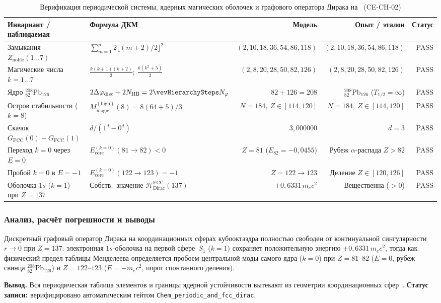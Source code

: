 \begin{table}[htbp]
\centering
\scriptsize
\setlength{\tabcolsep}{2.5pt}
\caption{Верификация периодической системы, ядерных магических оболочек и графового оператора Дирака на \latGCKshort\ (CE-CH-02)}
\label{tab:exp-ce-ch-02}
\begin{tabular}{@{}llrrr@{}}
\toprule
Инвариант / наблюдаемая & Формула ДКМ & Модель & Опыт / эталон & Статус \\
\midrule
Замыкания $Z_{\mathrm{noble}}(1\ldots 7)$ & $\sum_{m=1}^p 2\lfloor(m+2)/2\rfloor^2$ & $(2,10,18,36,54,86,118)$ & $(2,10,18,36,54,86,118)$ & PASS \\
Магические числа $k=1\ldots 7$ & $\frac{k(k+1)(k+2)}{3};\ \frac{k(k^2+5)}{3}$ & $(2,8,20,28,50,82,126)$ & $(2,8,20,28,50,82,126)$ & PASS \\
Ядро $^{208}_{82}\text{Pb}_{126}$ & $2\Delta\varphi_{\mathrm{disc}} + 2N_{\mathrm{HB}} = 2\vevHierarchySteps N_\varphi$ & $82 + 126 = 208$ & $^{208}_{82}\text{Pb}_{126}$ ($T_{1/2}=\infty$) & PASS \\
Остров стабильности ($k=8$) & $M_{\mathrm{magic}}^{(\mathrm{high})}(8) = 8(64+5)/3$ & $N=184,\ Z\in[114,120]$ & $N=184,\ Z\in[114,120]$ & PASS \\
Скачок $G_{\mathrm{FCC}}(0)-G_{\mathrm{FCC}}(1)$ & $d / (1^d - 0^d)$ & $3{,}000000$ & $d = 3$ & PASS \\
Переход $k=0$ через $E=0$ & $E_{\mathrm{core}}^{(k=0)}(81\to 82) < 0$ & $Z=81$ ($E_{82}=-0{,}0455$) & Рубеж $\alpha$-распада $Z>82$ & PASS \\
Пробой $k=0$ в $E=-1$ & $E_{\mathrm{core}}^{(k=0)}(122\to 123) = -1$ & $Z = 122 \to 123$ & Деление $Z\in[120,126]$ & PASS \\
Оболочка $1s$ ($k=1$) при $Z=137$ & Собств.\ значение $\mathcal{H}_{\mathrm{Dirac}}^{\mathrm{FCC}}(137)$ & $+0{,}6331\,m_e c^2$ & Вещественна ($>0$) & PASS \\
\bottomrule
\end{tabular}
\end{table}

\subsubsection*{Анализ, расчёт погрешности и выводы}
Дискретный графовый оператор Дирака на координационных сферах кубооктаэдра полностью свободен от континуальной сингулярности $r\to 0$ при $Z=137$: электронная $1s$-оболочка на первой сфере~$S_1$ ($k=1$) сохраняет положительную энергию $+0{,}6331\,m_e c^2$, тогда как физический предел таблицы Менделеева определяется пробоем центральной моды самого ядра ($k=0$) при $Z=81\text{--}82$ ($E=0$, рубеж свинца $^{208}_{82}\text{Pb}_{126}$) и $Z=122\text{--}123$ ($E=-m_e c^2$, порог спонтанного деления).

\textbf{Вывод.}
Вся периодическая таблица элементов и границы ядерной устойчивости вытекают из геометрии координационных сфер~\latGCKshort.
\textbf{Статус записи:} верифицировано автоматическим гейтом \texttt{Chem\_periodic\_and\_fcc\_dirac}.

